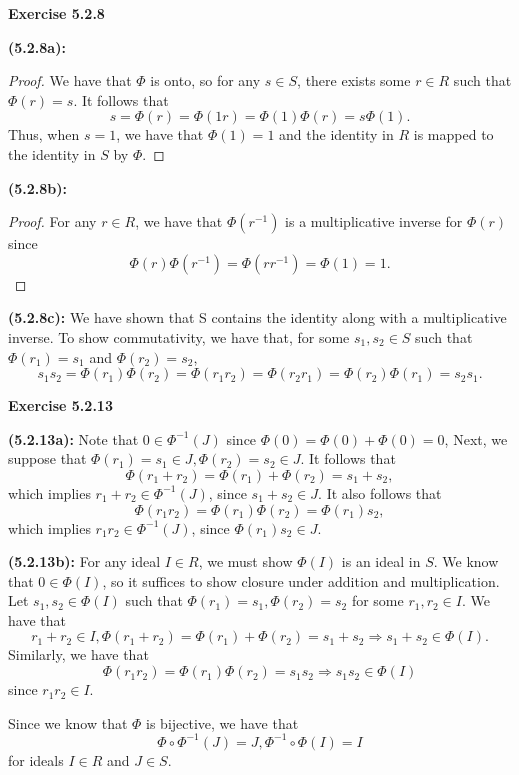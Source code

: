 \documentclass[12pt,oneside]{article}
\newenvironment{exercise}[1]{\vspace{.1in}\noindent\textbf{Exercise #1 \hspace{.05em}}}{}
\begin{document}

\begin{exercise}{5.2.8}

    \bigskip
    \textbf{(5.2.8a):}
    \begin{proof}
        We have that $\Phi$ is onto, so for any $s \in S$, there 
        exists some $r \in R$ such that $\Phi(r) = s$. It 
        follows that 
        \[
            s = \Phi(r) = \Phi(1r) = \Phi(1)\Phi(r) = s\Phi(1).    
        \]
        Thus, when $s = 1$, we have that $\Phi(1) = 1$ and the 
        identity in $R$ is mapped to the identity in $S$ by $\Phi$.
    \end{proof}

    \bigskip
    \textbf{(5.2.8b):}
    \begin{proof}
        For any $r \in R$, we have that $\Phi(r^{-1})$ is a 
        multiplicative inverse for $\Phi(r)$ since 
        \[
            \Phi(r)\Phi(r^{-1})=\Phi(rr^{-1})=\Phi(1)=1.    
        \]
    \end{proof}

    \bigskip
    \textbf{(5.2.8c):}
        We have shown that S contains the identity along with 
        a multiplicative inverse. To show commutativity, we have 
        that, for some $s_1,s_2 \in S$ such that $\Phi(r_1)=s_1$ 
        and $\Phi(r_2)=s_2$, 
        \[
            s_1s_2=\Phi(r_1)\Phi(r_2)=\Phi(r_1r_2)=\Phi(r_2r_1)=\Phi(r_2)\Phi(r_1)=s_2s_1.    
        \]
\end{exercise}

\newpage
\begin{exercise}{5.2.13}

    \bigskip
    \textbf{(5.2.13a):}
    Note that $0 \in \Phi^{-1}(J)$ since $\Phi(0) = \Phi(0)+\Phi(0)=0$,
    Next, we suppose that $\Phi(r_1)=s_1 \in J, \Phi(r_2)=s_2\in J$.
    It follows that 
    \[
        \Phi(r_1+r_2)=\Phi(r_1)+\Phi(r_2)=s_1+s_2,  
    \]
    which implies $r_1+r_2 \in \Phi^{-1}(J)$, since $s_1+s_2 \in J$.
    It also follows that
    \[
        \Phi(r_1r_2)=\Phi(r_1)\Phi(r_2)=\Phi(r_1)s_2,    
    \]
    which implies $r_1r_2 \in \Phi^{-1}(J)$, since $\Phi(r_1)s_2 \in J$.

    \bigskip
    \textbf{(5.2.13b):}
    For any ideal $I \in R$, we must show $\Phi(I)$ is an ideal in $S$.
    We know that $0 \in \Phi(I)$, so it suffices to show closure 
    under addition and multiplication. Let $s_1,s_2 \in \Phi(I)$ such 
    that $\Phi(r_1)=s_1,\Phi(r_2)=s_2$ for some $r_1,r_2 \in I$. 
    We have that 
    \[
        r_1+r_2 \in I, \Phi(r_1+r_2)=\Phi(r_1)+\Phi(r_2)=s_1+s_2 \Rightarrow s_1+s_2 \in \Phi(I).    
    \]
    Similarly, we have that 
    \[
        \Phi(r_1r_2)=\Phi(r_1)\Phi(r_2)=s_1s_2 \Rightarrow s_1s_2 \in \Phi(I)    
    \]
    since $r_1r_2 \in I$.

    Since we know that $\Phi$ is bijective, we have that 
    \[
        \Phi \circ \Phi^{-1}(J)=J, \Phi^{-1}\circ\Phi(I)=I 
    \]
    for ideals $I \in R$ and $J \in S$.

\end{exercise}
\end{document}
